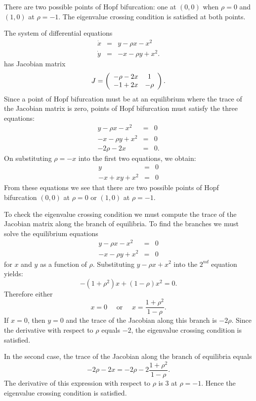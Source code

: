 \documentclass{ximera}
\begin{document}
\ans  There are two possible points of Hopf bifurcation: one at $(0,0)$ 
when $\rho=0$ and $(1,0)$ at $\rho=-1$.  The eigenvalue crossing condition is
satisfied at both points.

\soln  The system of differential equations
\[
\begin{array}{rcl}
\dot{x} & = & y - \rho x - x^2   \\
\dot{y} & = & -x - \rho y + x^2.
\end{array}
\]
has Jacobian matrix 
\[
J = \left(\begin{array}{cc} -\rho-2x & 1\\ -1+2x &-\rho\end{array}\right).
\]
Since a point of Hopf bifurcation must be at an equilibrium where the trace
of the Jacobian matrix is zero, points of Hopf bifurcation must satisfy the
three equations:
\begin{eqnarray*}
y - \rho x - x^2 & = & 0\\
-x - \rho y + x^2 & = & 0\\
-2\rho-2x & = & 0.
\end{eqnarray*}
On substituting $\rho = -x$ into the first two equations, we obtain:
\begin{eqnarray*}
y  & = & 0\\
-x + xy + x^2 & = & 0
\end{eqnarray*}
From these equations we see that there are two possible points of Hopf
bifurcation $(0,0)$ at $\rho=0$ or $(1,0)$ at $\rho=-1$.  

To check the eigenvalue crossing condition we must compute the trace of the
Jacobian matrix along the branch of equilibria.  To find the branches we must
solve the equilibrium equations
\begin{eqnarray*}
y - \rho x - x^2 & = & 0\\
-x - \rho y + x^2 & = & 0
\end{eqnarray*}
for $x$ and $y$ as a function of $\rho$.  Substituting $y - \rho x+x^2$ into
the $2^{nd}$ equation yields:
\[
-(1+\rho^2)x + (1-\rho)x^2 = 0.
\]
Therefore either 
\[
x= 0 \quad \mbox{ or } \quad  x = \frac{1+\rho^2}{1-\rho}.
\]
If $x=0$, then $y=0$ and the trace of the Jacobian along this branch is
$-2\rho$.  Since the derivative with respect to $\rho$ equals $-2$, the
eigenvalue crossing condition is satisfied.

In the second case, the trace of the Jacobian along the branch of equilibria
equals
\[
-2\rho-2x = -2\rho -2\frac{1+\rho^2}{1-\rho}.
\]
The derivative of this expression with respect to $\rho$ is $3$ at $\rho=-1$.
Hence the eigenvalue crossing condition is satisfied.
\end{document}
